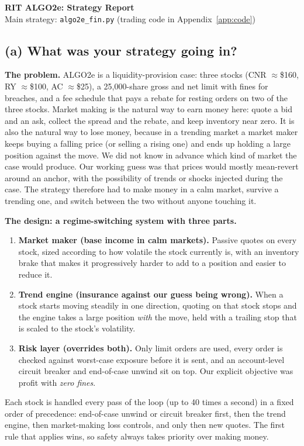 \documentclass[10pt]{article}
\newcommand{\code}[1]{\texttt{#1}}
\newcommand{\q}[1]{\vspace{4pt}\subsection*{#1}\vspace{-2pt}}
\begin{document}
\begin{center}
{\Large\bfseries RIT ALGO2e: Strategy Report}\\[2pt]
Main strategy: \code{algo2e\_fin.py} (trading code in Appendix~\ref{app:code})
\end{center}

\q{(a) What was your strategy going in?}

\textbf{The problem.} ALGO2e is a liquidity-provision case: three stocks (CNR $\approx$\$160, RY $\approx$\$100, AC $\approx$\$25), a 25{,}000-share gross and net
limit with fines for breaches, and a fee schedule that pays a rebate for resting orders on two of the three stocks. Market making is the natural way to earn money
here: quote a bid and an ask, collect the spread and the rebate, and keep inventory near zero. It is also the natural way to lose money, because in a trending market
a market maker keeps buying a falling price (or selling a rising one) and ends up holding a large position against the move. We did not know in advance which kind
of market the case would produce. Our working guess was that prices would mostly mean-revert around an anchor, with the possibility of trends or shocks injected during
the case. The strategy therefore had to make money in a calm market, survive a trending one, and switch between the two without anyone touching it.

\textbf{The design: a regime-switching system with three parts.}
\begin{enumerate}
  \item \textbf{Market maker (base income in calm markets).} Passive quotes on every stock, sized according to how volatile the stock currently is, with an
        inventory brake that makes it progressively harder to add to a position and easier to reduce it.
  \item \textbf{Trend engine (insurance against our guess being wrong).} When a stock starts moving steadily in one direction, quoting on that stock stops and
        the engine takes a large position \emph{with} the move, held with a trailing stop that is scaled to the stock's volatility.
  \item \textbf{Risk layer (overrides both).} Only limit orders are used, every order is checked against worst-case exposure before it is sent, and an account-level
        circuit breaker and end-of-case unwind sit on top. Our explicit objective was profit with \emph{zero fines}.
\end{enumerate}
Each stock is handled every pass of the loop (up to 40 times a second) in a fixed order of precedence: end-of-case unwind or circuit breaker first, then the trend engine,
then market-making loss controls, and only then new quotes. The first rule that applies wins, so safety always takes priority over making money.
\end{document}
